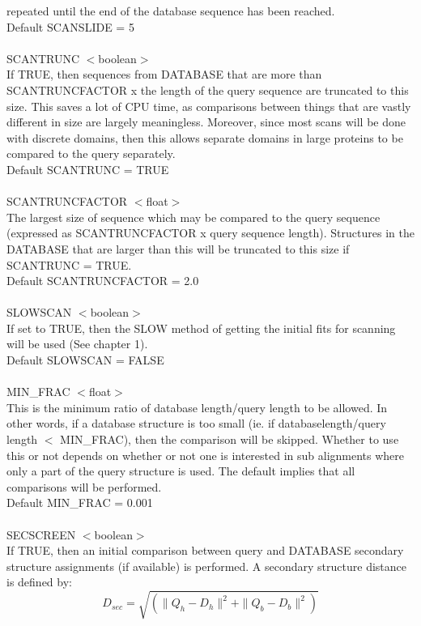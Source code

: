 repeated until the end of the database sequence has been reached.\\
Default SCANSLIDE = 5 \\
\\
SCANTRUNC $<$boolean$>$\\
If TRUE, then sequences from DATABASE that are more than
SCANTRUNCFACTOR x the length of the query sequence are truncated to
this size.  This saves a lot of CPU time, as comparisons between 
things that are vastly different in size are largely meaningless. 
Moreover, since most scans will be done with discrete domains, then
this allows separate domains in large proteins to be compared 
to the query separately.\\
Default SCANTRUNC = TRUE\\
\\
SCANTRUNCFACTOR $<$float$>$\\
The largest size of sequence which may be compared to the query 
sequence (expressed as SCANTRUNCFACTOR x query sequence length). 
Structures in the DATABASE that are larger than this will be
truncated  to this size if SCANTRUNC = TRUE.\\
Default SCANTRUNCFACTOR = 2.0\\
\\
SLOWSCAN $<$boolean$>$\\
If set to TRUE, then the SLOW method of getting the initial fits
for scanning will be used (See chapter 1).\\
Default SLOWSCAN = FALSE\\
\\
MIN\_FRAC $<$float$>$\\
This is the minimum ratio of database length/query length to be 
allowed.  In other words, if a database structure is too small 
(ie. if databaselength/query length $<$ MIN\_FRAC), then the
comparison will be skipped.  Whether to use this or not depends on
whether or not one is interested in sub alignments where only a
part of the query structure is used.  The default implies that all
comparisons will be performed.\\
Default MIN\_FRAC = 0.001\\
\\
SECSCREEN $<$boolean$>$\\
If TRUE, then an initial comparison between query and DATABASE
secondary structure assignments (if available) is performed.  A
secondary structure distance is defined by:\\

\[
D_{sec} = \sqrt{(\|Q_{h} - D_{h}\|^{2} + \|Q_{b} - D_{b}\|^{2})}
\]

